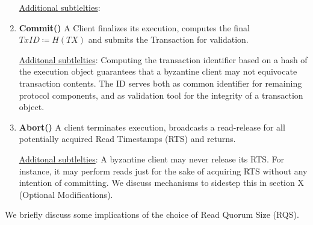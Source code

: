 \begin{enumerate}
\underline{Additional subtlelties}: 



\item \textbf{Commit()} A Client finalizes its execution, computes the final $TxID \coloneqq H(TX)$  and submits the Transaction for validation.

\underline{Additonal subtlelties}: Computing the transaction identifier based on a hash of the execution object guarantees that a byzantine client may not equivocate transaction contents. The ID serves both as common identifier for remaining protocol components, and as validation tool for the integrity of a transaction object.

\item \textbf{Abort()} A client terminates execution, broadcasts a read-release for all potentially acquired Read Timestamps (RTS) and returns.

\underline{Additonal subtlelties}: A byzantine client may never release its RTS. For instance, it may perform reads just for the sake of acquiring RTS without any intention of committing. We discuss mechanisms to sidestep this in section X (Optional Modifications).

\end{enumerate}

 
We briefly discuss some implications of the choice of Read Quorum Size (RQS).
 
